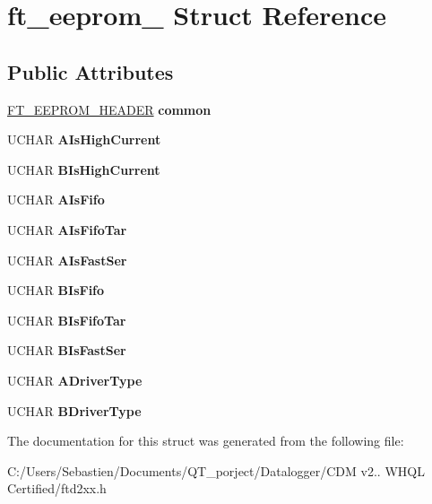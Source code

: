 \hypertarget{structft__eeprom__2232}{}\section{ft\+\_\+eeprom\+\_ Struct Reference}
\label{structft__eeprom__2232}
\subsection*{Public Attributes}
\begin{DoxyCompactItemize}
\item 
\mbox{\label{structft__eeprom__2232_a6b294dc09899eb022f2e949b3d5c4972}} 
\hyperlink{structft__eeprom__header}{F\+T\+\_\+\+E\+E\+P\+R\+O\+M\+\_\+\+H\+E\+A\+D\+ER} {\bfseries common}
\item 
\mbox{\label{structft__eeprom__2232_a66f55cd8947dc7015515038a35495ddc}} 
U\+C\+H\+AR {\bfseries A\+Is\+High\+Current}
\item 
\mbox{\label{structft__eeprom__2232_a2d7b4af1ab0e3b0084e13b83f513b5d5}} 
U\+C\+H\+AR {\bfseries B\+Is\+High\+Current}
\item 
\mbox{\label{structft__eeprom__2232_acf4ea789894df80107249291ac055a6f}} 
U\+C\+H\+AR {\bfseries A\+Is\+Fifo}
\item 
\mbox{\label{structft__eeprom__2232_a6b3aab2f52076295cc32a5a785194b78}} 
U\+C\+H\+AR {\bfseries A\+Is\+Fifo\+Tar}
\item 
\mbox{\label{structft__eeprom__2232_acbcbf6335afad8a22eac6a575f385785}} 
U\+C\+H\+AR {\bfseries A\+Is\+Fast\+Ser}
\item 
\mbox{\label{structft__eeprom__2232_a090431f3dee969f1fd88cf30aabffe2f}} 
U\+C\+H\+AR {\bfseries B\+Is\+Fifo}
\item 
\mbox{\label{structft__eeprom__2232_a576a9319f978ff28d3bb0a042d6196a8}} 
U\+C\+H\+AR {\bfseries B\+Is\+Fifo\+Tar}
\item 
\mbox{\label{structft__eeprom__2232_a33a65a0fbacf825f9af5903b834b9ab2}} 
U\+C\+H\+AR {\bfseries B\+Is\+Fast\+Ser}
\item 
\mbox{\label{structft__eeprom__2232_ad86a60a990160e5976e563365b7d05d0}} 
U\+C\+H\+AR {\bfseries A\+Driver\+Type}
\item 
\mbox{\label{structft__eeprom__2232_a74407077c9097bf480f560b0511daf79}} 
U\+C\+H\+AR {\bfseries B\+Driver\+Type}
\end{DoxyCompactItemize}


The documentation for this struct was generated from the following file\+:\begin{DoxyCompactItemize}
\item 
C\+:/\+Users/\+Sebastien/\+Documents/\+Q\+T\+\_\+porject/\+Datalogger/\+C\+D\+M v2.. W\+H\+Q\+L Certified/ftd2xx.\+h\end{DoxyCompactItemize}
